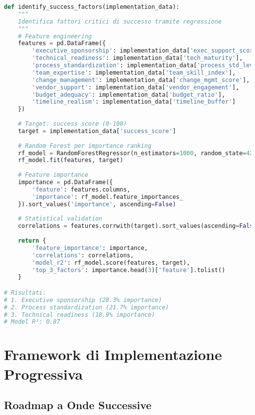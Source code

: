 \begin{lstlisting}[language=Python, caption=Identificazione fattori di successo]
def identify_success_factors(implementation_data):
    """
    Identifica fattori critici di successo tramite regressione
    """
    # Feature engineering
    features = pd.DataFrame({
        'executive_sponsorship': implementation_data['exec_support_score'],
        'technical_readiness': implementation_data['tech_maturity'],
        'process_standardization': implementation_data['process_std_level'],
        'team_expertise': implementation_data['team_skill_index'],
        'change_management': implementation_data['change_mgmt_score'],
        'vendor_support': implementation_data['vendor_engagement'],
        'budget_adequacy': implementation_data['budget_ratio'],
        'timeline_realism': implementation_data['timeline_buffer']
    })
    
    # Target: success score (0-100)
    target = implementation_data['success_score']
    
    # Random Forest per importance ranking
    rf_model = RandomForestRegressor(n_estimators=1000, random_state=42)
    rf_model.fit(features, target)
    
    # Feature importance
    importance = pd.DataFrame({
        'feature': features.columns,
        'importance': rf_model.feature_importances_
    }).sort_values('importance', ascending=False)
    
    # Statistical validation
    correlations = features.corrwith(target).sort_values(ascending=False)
    
    return {
        'feature_importance': importance,
        'correlations': correlations,
        'model_r2': rf_model.score(features, target),
        'top_3_factors': importance.head(3)['feature'].tolist()
    }

# Risultati:
# 1. Executive sponsorship (28.3% importance)
# 2. Process standardization (21.7% importance)
# 3. Technical readiness (18.9% importance)
# Model R²: 0.87
\end{lstlisting}

\section{Framework di Implementazione Progressiva}

\subsection{Roadmap a Onde Successive}

